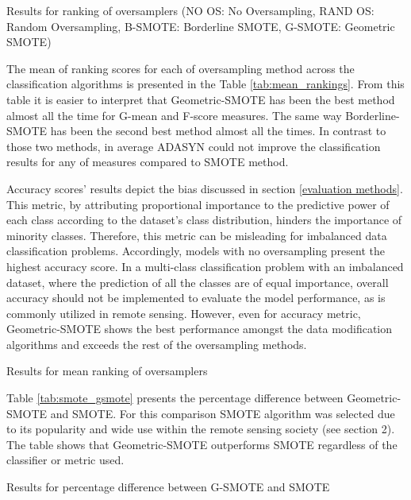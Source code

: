 \documentclass[parskip=full]{scrartcl}
\begin{document}
\begin{table}[H]
	\centering
	\caption{\label{tab:ranking} Results for ranking of oversamplers (NO OS: No Oversampling, RAND OS: Random Oversampling, B-SMOTE: Borderline SMOTE, G-SMOTE: Geometric SMOTE)}
\end{table}

The mean of ranking scores for each of oversampling method across the
classification algorithms is presented in the Table \ref{tab:mean_rankings}.
From this table it is easier to interpret that Geometric-SMOTE has been the best
method almost all the time for G-mean and F-score measures. The same way
Borderline-SMOTE has been the second best method almost all the times. In
contrast to those two methods, in average ADASYN could not improve the
classification results for any of measures compared to SMOTE method.

Accuracy scores' results depict the bias discussed in section \ref{evaluation
methods}. This metric, by attributing proportional importance to the predictive
power of each class according to the dataset's class distribution, hinders the
importance of minority classes. Therefore, this metric can be misleading for
imbalanced data classification problems. Accordingly, models with no
oversampling present the highest accuracy score. In a multi-class classification
problem with an imbalanced dataset, where the prediction of all the classes are
of equal importance, overall accuracy should not be implemented to evaluate the
model performance, as is commonly utilized in remote sensing. However, even for
accuracy metric, Geometric-SMOTE shows the best performance amongst the data
modification algorithms and exceeds the rest of the oversampling methods.


\begin{table}[H]
	\centering
	\caption{\label{tab:mean_rankings} Results for mean ranking of oversamplers}
\end{table}


Table \ref{tab:smote_gsmote} presents the percentage difference  between
Geometric-SMOTE and SMOTE. For this comparison SMOTE algorithm was selected due
to its popularity and wide use within the remote sensing society (see section
2). The table shows that Geometric-SMOTE outperforms SMOTE regardless of the
classifier or metric used.

\begin{table}[H]
	\centering
	\caption{\label{tab:smote_gsmote}Results for percentage difference between
		G-SMOTE and SMOTE}
\end{table}
\end{document}
